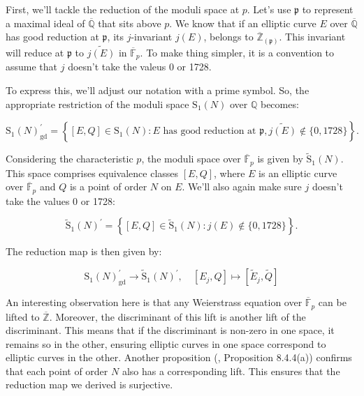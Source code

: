 First, we'll tackle the reduction of the moduli space at \( p \). Let's use \( \mathfrak{p} \) to represent a maximal ideal of \( \overline{\mathbb{Q}} \) that sits above \( p \). We know that if an elliptic curve \( E \) over \( \overline{\mathbb{Q}} \) has good reduction at \( \mathfrak{p} \), its \( j \)-invariant \( j(E) \), belongs to \( \overline{\mathbb{Z}}_{(\mathfrak{p})} \). This invariant will reduce at \( \mathfrak{p} \) to \( \widetilde{j(E)} \) in \( \overline{\mathbb{F}}_{p} \). To make thing simpler, it is a convention to assume that $j$ doesn't take the valeus 0 or 1728. 

To express this, we'll adjust our notation with a prime symbol. So, the appropriate restriction of the moduli space \( \mathrm{S}_{1}(N) \) over \( \mathbb{Q} \) becomes:

\[
\mathrm{S}_{1}(N)_{\mathrm{gd}}^{\prime}=\left\{[E, Q] \in \mathrm{S}_{1}(N): E \text { has good reduction at } \mathfrak{p}, \widetilde{j(E)} \notin\{0,1728\}\right\} .
\]

Considering the characteristic \( p \), the moduli space over \( \overline{\mathbb{F}}_{p} \) is given by \( \widetilde{\mathrm{S}}_{1}(N) \). This space comprises equivalence classes \( [E, Q] \), where \( E \) is an elliptic curve over \( \overline{\mathbb{F}}_{p} \) and \( Q \) is a point of order \( N \) on \( E \). We'll also again make sure \( j \) doesn't take the values 0 or 1728:

\[
\widetilde{\mathrm{S}}_{1}(N)^{\prime}=\left\{[E, Q] \in \widetilde{\mathrm{S}}_{1}(N): j(E) \notin\{0,1728\}\right\} .
\]

The reduction map is then given by:

\[
\mathrm{S}_{1}(N)_{\mathrm{gd}}^{\prime} \longrightarrow \widetilde{\mathrm{S}}_{1}(N)^{\prime}, \quad\left[E_{j}, Q\right] \mapsto\left[\widetilde{E}_{j}, \widetilde{Q}\right]
\]

An interesting observation here is that any Weierstrass equation over \( \overline{\mathbb{F}}_{p} \) can be lifted to \( \overline{\mathbb{Z}} \). Moreover, the discriminant of this lift is another lift of the discriminant. This means that if the discriminant is non-zero in one space, it remains so in the other, ensuring elliptic curves in one space correspond to elliptic curves in the other. Another proposition (\cite{diamond2005first}, Proposition 8.4.4(a)) confirms that each point of order \( N \) also has a corresponding lift. This ensures that the reduction map we derived is surjective.

